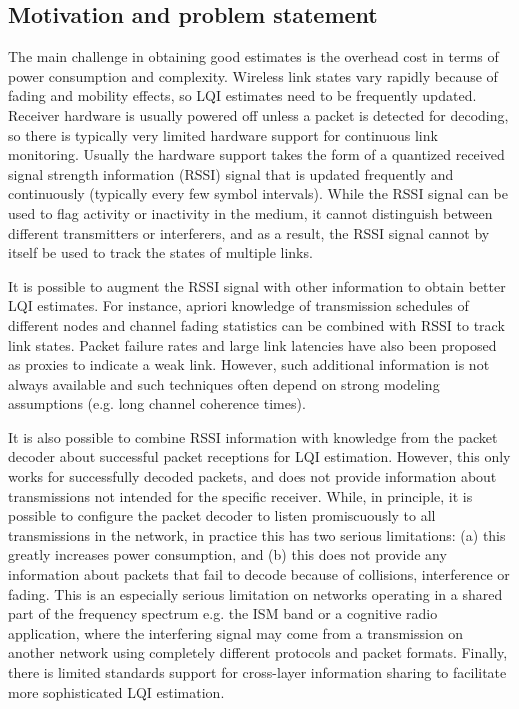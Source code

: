 \documentclass[journal]{IEEEtran}
\begin{document}
\subsection{Motivation and problem statement}

The main challenge in obtaining good estimates is the overhead cost in terms of
power consumption and complexity. Wireless link states vary rapidly because of
fading and mobility effects, so LQI estimates need to be frequently updated.
Receiver hardware is usually powered off unless a packet is detected for
decoding, so there is typically very limited hardware support for continuous
link monitoring. Usually the hardware support takes the form of a quantized
received signal strength information (RSSI) signal that is updated frequently
and continuously (typically every few symbol intervals). While the RSSI signal
can be used to flag activity or inactivity in the medium, it cannot distinguish
between different transmitters or interferers, and as a result, the RSSI signal
cannot by itself be used to track the states of multiple links.

It is possible to augment the RSSI signal with other information to obtain
better LQI estimates. For instance, apriori knowledge of transmission schedules
of different nodes and channel fading statistics can be combined with RSSI to
track link states. Packet failure rates and large link latencies have also been
proposed as proxies to indicate a weak link. However, such additional
information is not always available and such techniques often depend on strong
modeling assumptions (e.g. long channel coherence times).

It is also possible to combine RSSI information with knowledge from the packet
decoder about successful packet receptions for LQI estimation. However, this
only works for successfully decoded packets, and does not provide information
about transmissions not intended for the specific receiver. While, in
principle, it is possible to configure the packet decoder to listen
promiscuously to all transmissions in the network, in practice this has two
serious limitations: (a) this greatly increases power consumption, and (b) this
does not provide any information about packets that fail to decode because of
collisions, interference or fading. This is an especially serious limitation on
networks operating in a shared part of the frequency spectrum e.g. the ISM band
or a cognitive radio application, where the interfering signal may come from a
transmission on another network using completely different protocols and packet
formats. Finally, there is limited standards support for cross-layer
information sharing to facilitate more sophisticated LQI estimation.
\end{document}
